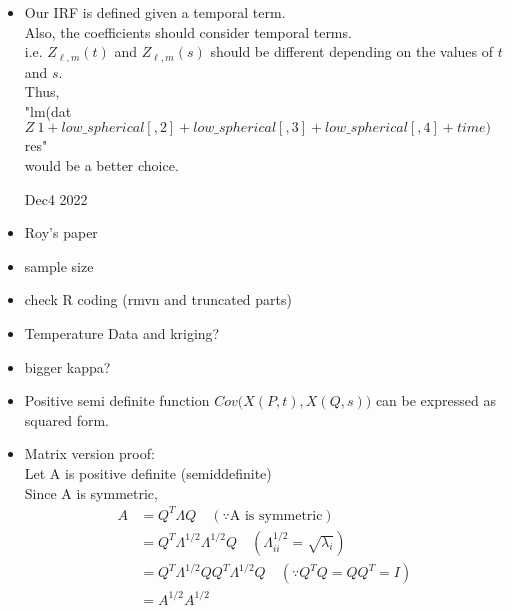 \documentclass[11pt]{article}
\begin{document}
\begin{itemize}
\item
Our IRF is defined given a temporal term.\\
Also, the coefficients should consider temporal terms.\\ 
i.e. $Z_{\ell,m}(t)$ and $Z_{\ell,m}(s)$ should be different depending on the values of $t$ and $s$.\\
Thus,\\
"lm(dat$Z ~ 1 + low\_spherical[,2] + low\_spherical[,3] + low\_spherical[,4] + time)$res"\\
would be a better choice.\\

\pagebreak

Dec4 2022\\

\item Roy's paper\\

\item sample size\\

\item check R coding (rmvn and truncated parts)\\

\item Temperature Data and kriging?\\

\item bigger kappa?\\

\pagebreak

\item
Positive semi definite function $Cov\biggl(X(P,t), X(Q,s)\biggl)$ can be expressed as squared form.\\

\item
Matrix version proof:\\
Let A is positive definite (semiddefinite)\\
Since A is symmetric,\\
\begin{align*}
A &= Q^T \Lambda Q \quad (\because \text{A is symmetric})\\
&= Q^T \Lambda^{1/2} \Lambda^{1/2} Q \quad (\Lambda_{ii}^{1/2}=\sqrt{\lambda_i})\\
&= Q^T \Lambda^{1/2} Q Q^T \Lambda^{1/2} Q \quad (\because Q^T Q = Q Q^T =I)\\
&= A^{1/2} A^{1/2}\\
\end{align*}


\end{itemize}
\end{document}
